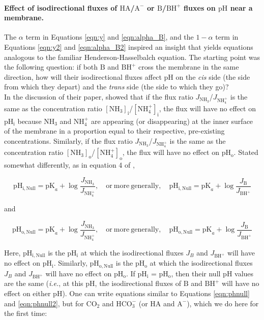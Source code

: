 \documentclass[fleqn,10pt]{physiome}
\begin{document}
\paragraph{Effect of isodirectional fluxes of $\mathrm{HA}$/$\mathrm{A^-}$ or $\mathrm{B}$/$\mathrm{BH^+}$ fluxes on $\mathrm{pH}$ near a membrane.} 
The $\alpha$ term in Equations \ref{eqn:y} and \ref{eqn:alpha_B}, and the $1-\alpha$ term in Equations \ref{eqn:y2} and \ref{eqn:alpha_B2} inspired an insight that yields equations analogous to the familiar Henderson-Hasselbalch equation. The starting point was the following question: if both $\mathrm{B}$ and $\mathrm{BH^+}$ cross the membrane in the same direction, how will their isodirectional fluxes affect $\mathrm{pH}$ on the \emph{cis} side (the side from which they depart) and the \emph{trans} side (the side to which they go)?\\

In the discussion of their paper, \cite{musa2009concentration} showed that if the flux ratio $J_\mathrm{NH_3}$/$J_\mathrm{NH_4^+}$ is the same as the concentration ratio $\mathrm{[NH_3]_i}$/$\mathrm{[NH_4^+]_i}$, the flux will have no effect on $\mathrm{pH_i}$ because $\mathrm{NH_3}$ and $\mathrm{NH_4^+}$ are appearing (or disappearing) at the inner surface of the membrane in a proportion equal to their respective, pre-existing concentrations. Similarly, if the flux ratio $J_\mathrm{NH_3}$/$J_\mathrm{NH_4^+}$ is the same as the concentration ratio $\mathrm{[NH_3]_o}$/$\mathrm{[NH_4^+]_o}$, the flux will have no effect on $\mathrm{pH_o}$. Stated somewhat differently, as in equation 4 of \cite{musa2009concentration} ,

\begin{equation}
\mathrm{pH_{i,Null}}=\mathrm{pK}_a+\log \dfrac{J_\mathrm{NH_3}}{J_\mathrm{NH_4^+}},\quad \mathrm{or~ more~ generally},\quad \mathrm{pH_{i,Null}}=\mathrm{pK}_a+\log \dfrac{J_\mathrm{B}}{J_\mathrm{BH^+}}
\label{eqn:phnull}
\end{equation}

and

\begin{equation}
\mathrm{pH_{o,Null}}=\mathrm{pK}_a+\log \dfrac{J_\mathrm{NH_3}}{J_\mathrm{NH_4^+}},\quad \mathrm{or~ more~ generally},\quad \mathrm{pH_{o,Null}}=\mathrm{pK}_a+\log \dfrac{J_\mathrm{B}}{J_\mathrm{BH^+}}
\label{eqn:phnull2}
\end{equation}

Here, $\mathrm{pH_{i,Null}}$ is the $\mathrm{pH_i}$ at which the isodirectional fluxes $J_B$ and $J_\mathrm{BH^+}$ will have no effect on $\mathrm{pH_i}$. Similarly, $\mathrm{pH_{o,Null}}$ is the  $\mathrm{pH_o}$ at which the isodirectional fluxes $J_B$ and $J_\mathrm{BH^+}$ will have no effect on $\mathrm{pH_o}$. If $\mathrm{pH_i}$ = $\mathrm{pH_o}$, then their null $\mathrm{pH}$ values are the same (\emph{i.e.}, at this $\mathrm{pH}$, the isodirectional fluxes of $\mathrm{B}$ and $\mathrm{BH^+}$ will have no effect on either $\mathrm{pH}$). One can write equations similar to Equations \ref{eqn:phnull} and \ref{eqn:phnull2}, but for $\mathrm{CO_2}$ and $\mathrm{HCO_3^-}$ (or $\mathrm{HA}$ and $\mathrm{A^-}$), which we do here for the first time:
 
\end{document}
